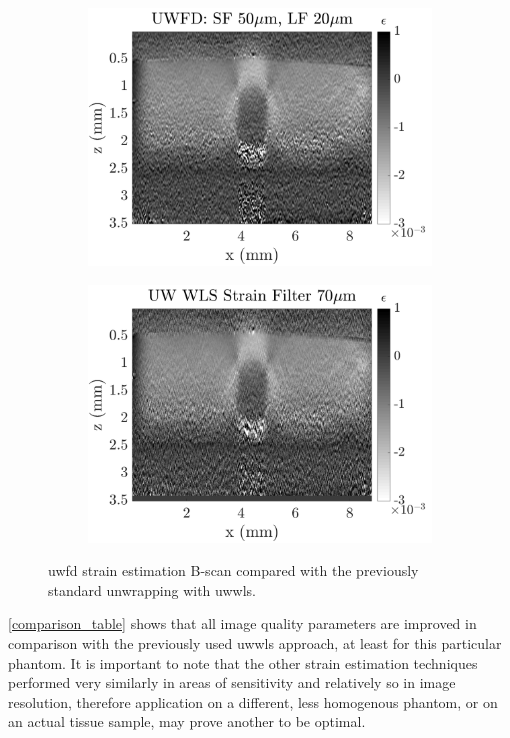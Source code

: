 \begin{figure}
	\centering
	\begin{subfigure}{0.49\textwidth}
		\centering
		\includegraphics[width=\textwidth]{figures/uwfd_compare.png}
	\end{subfigure}
	\begin{subfigure}{0.49\textwidth}
		\centering
		\includegraphics[width=\textwidth]{figures/wls_compare.png}
	\end{subfigure}
	\caption{\ac{uwfd} strain estimation B-scan compared with the previously standard unwrapping with \ac{uwwls}.}
	\label{wls_uwfd_compare}
\end{figure}

\autoref{comparison_table} shows that all image quality parameters are improved in comparison with the previously used \ac{uwwls} approach, at least for this particular phantom. It is important to note that the other strain estimation techniques performed very similarly in areas of sensitivity and relatively so in image resolution, therefore application on a different, less homogenous phantom, or on an actual tissue sample, may prove another to be optimal.

